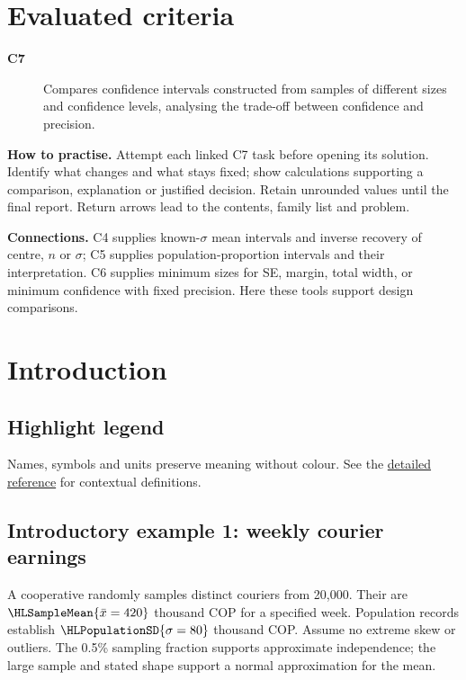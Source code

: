 \maketitle
\setcounter{tocdepth}{1}
\setcounter{secnumdepth}{2}
\label{toc}
\tableofcontents
\section*{Evaluated criteria}
\begin{description}
\item[\textbf{C7}] Compares confidence intervals constructed from samples of different sizes and confidence levels, analysing the trade-off between confidence and precision.
\end{description}
\textbf{How to practise.} Attempt each linked C7 task before opening its solution. Identify what changes and what stays fixed; show calculations supporting a comparison, explanation or justified decision. Retain unrounded values until the final report. Return arrows lead to the contents, family list and problem.

\textbf{Connections.} C4 supplies known-$\sigma$ mean intervals and inverse recovery of centre, $n$ or $\sigma$; C5 supplies population-proportion intervals and their interpretation. C6 supplies minimum sizes for SE, margin, total width, or minimum confidence with fixed precision. Here these tools support design comparisons.
\clearpage
\section{Introduction}\label{sec:introduction}
\subsection*{Highlight legend}\label{tab:highlight-legend}
Names, symbols and units preserve meaning without colour. See the \hyperref[tab:notation-reference]{detailed reference} for contextual definitions.
\subsection{Introductory example 1: weekly courier earnings}\label{ex:intro-one}
A cooperative randomly samples  distinct couriers from 20,000. Their  are $\HLSampleMean{\bar x=420}$ thousand COP for a specified week. Population records establish $\HLPopulationSD{\sigma=80}$ thousand COP. Assume no extreme skew or outliers. The 0.5\% sampling fraction supports approximate independence; the large sample and stated shape support a normal approximation for the mean.

